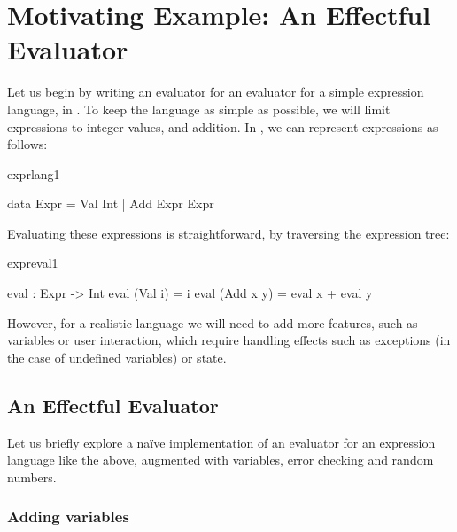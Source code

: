 \section{Motivating Example: An Effectful Evaluator}

Let us begin by writing an evaluator for an evaluator for a simple expression
language, in \Idris{}. 
To keep the language as simple as possible, we will limit expressions
to integer values, and addition. In \Idris{}, we can represent expressions
as follows:

\begin{SaveVerbatim}{exprlang1}

data Expr = Val Int 
          | Add Expr Expr

\end{SaveVerbatim}

\noindent
Evaluating these expressions is straightforward, by traversing the expression
tree:

\begin{SaveVerbatim}{expreval1}

eval : Expr -> Int
eval (Val i) = i
eval (Add x y) = eval x + eval y

\end{SaveVerbatim}

\noindent
However, for a realistic language we will need to add more features, such
as variables or user interaction, which require handling effects such as
exceptions (in the case of undefined variables) or state.

\subsection{An Effectful Evaluator}

\label{sect:naiveeval}

Let us briefly explore a na\"{i}ve implementation of an
evaluator for an expression language like the above, augmented with
variables, error checking and random numbers.

\subsubsection{Adding variables}

